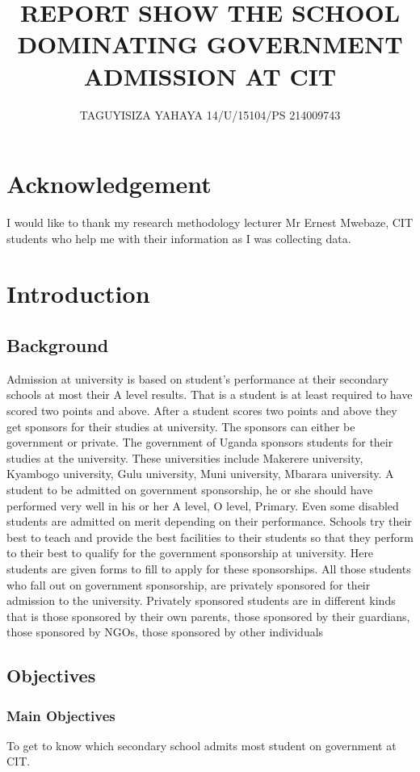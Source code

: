 \documentclass[12]{article}
\begin{document}
\title{REPORT SHOW THE SCHOOL DOMINATING GOVERNMENT ADMISSION AT CIT}
\maketitle
\author{TAGUYISIZA YAHAYA   14/U/15104/PS    214009743}
\newpage
\section{Acknowledgement}
I would like to thank my research methodology lecturer Mr Ernest Mwebaze, CIT students who help me with their information as I was collecting data.
\section{Introduction}
\subsection{Background}
Admission at university is based on student’s performance at their secondary schools at most their A level results. That is a student is at least required to have scored two points and above. After a student scores two points and above they get sponsors for their studies at university. The sponsors can either be government or private. The government of Uganda sponsors students for their studies at the university. These universities include Makerere university, Kyambogo university, Gulu university, Muni university, Mbarara university. A student to be admitted on government sponsorship, he or she should have performed very well in his or her A level, O level, Primary. Even some disabled students are admitted on merit depending on their performance. Schools try their best to teach and provide the best facilities to their students so that they perform to their best to qualify for the government sponsorship at university. Here students are given forms to fill to apply for these sponsorships. All those students who fall out on government sponsorship, are privately sponsored for their admission to the university.
Privately sponsored students are in different kinds that is those sponsored by their own parents, those sponsored by their guardians, those sponsored by NGOs, those sponsored by other individuals

\subsection{Objectives}
\subsubsection{Main Objectives}
To get to know which secondary school admits most student on government at CIT.
\end{document}
